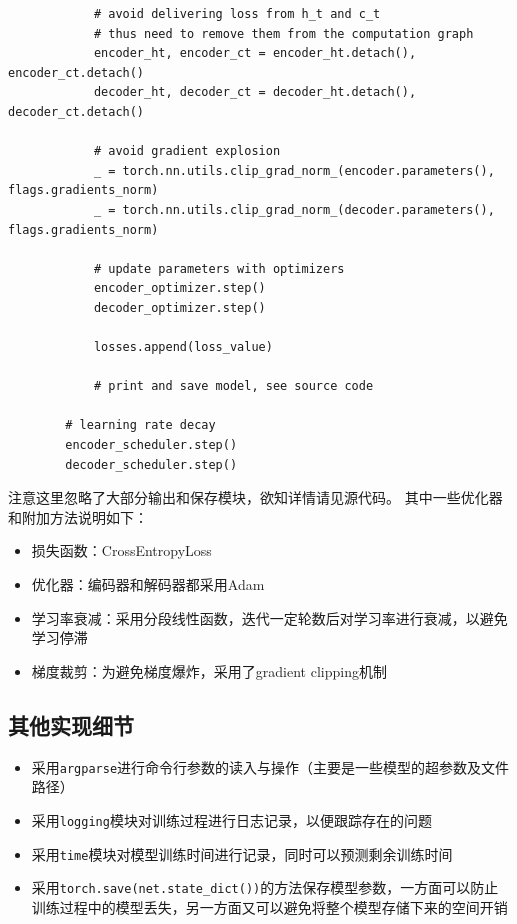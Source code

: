 \documentclass[logo,reportComp]{thesis}
\begin{document}
\begin{lstlisting}
            # avoid delivering loss from h_t and c_t
            # thus need to remove them from the computation graph
            encoder_ht, encoder_ct = encoder_ht.detach(), encoder_ct.detach()
            decoder_ht, decoder_ct = decoder_ht.detach(), decoder_ct.detach()

            # avoid gradient explosion
            _ = torch.nn.utils.clip_grad_norm_(encoder.parameters(), flags.gradients_norm)
            _ = torch.nn.utils.clip_grad_norm_(decoder.parameters(), flags.gradients_norm)

            # update parameters with optimizers
            encoder_optimizer.step()
            decoder_optimizer.step()

            losses.append(loss_value)

            # print and save model, see source code

        # learning rate decay
        encoder_scheduler.step()
        decoder_scheduler.step()
\end{lstlisting}

注意这里忽略了大部分输出和保存模块，欲知详情请见源代码。
其中一些优化器和附加方法说明如下：
\begin{itemize}
    \item 损失函数：CrossEntropyLoss
    \item 优化器：编码器和解码器都采用Adam
    \item 学习率衰减：采用分段线性函数，迭代一定轮数后对学习率进行衰减，以避免学习停滞
    \item 梯度裁剪：为避免梯度爆炸，采用了gradient clipping机制
\end{itemize}

\subsection{其他实现细节}
\begin{itemize}
    \item 采用\verb'argparse'进行命令行参数的读入与操作（主要是一些模型的超参数及文件路径）
    \item 采用\verb'logging'模块对训练过程进行日志记录，以便跟踪存在的问题
    \item 采用\verb'time'模块对模型训练时间进行记录，同时可以预测剩余训练时间
    \item 采用\verb'torch.save(net.state_dict())'的方法保存模型参数，一方面可以防止训练过程中的模型丢失，另一方面又可以避免将整个模型存储下来的空间开销
\end{itemize}
\end{document}
